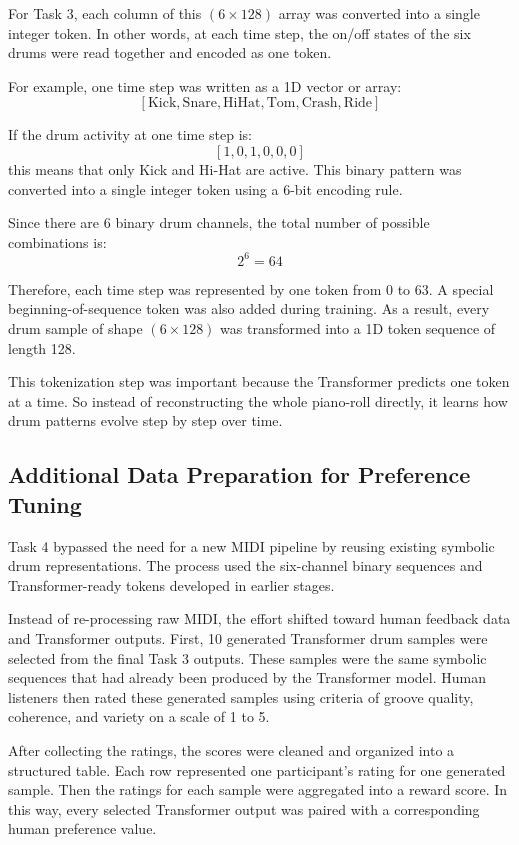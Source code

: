 \documentclass[conference]{IEEEtran}
\begin{document}
For Task 3, each column of this $(6 \times 128)$ array was converted into a single integer token. In other words, at each time step, the on/off states of the six drums were read together and encoded as one token.

For example, one time step was written as a 1D vector or array:
\[
[\text{Kick}, \text{Snare}, \text{HiHat}, \text{Tom}, \text{Crash}, \text{Ride}]
\]

If the drum activity at one time step is:
\[
[1,0,1,0,0,0]
\]
this means that only Kick and Hi-Hat are active. This binary pattern was converted into a single integer token using a 6-bit encoding rule.

Since there are 6 binary drum channels, the total number of possible combinations is:
\[
2^6 = 64
\]

Therefore, each time step was represented by one token from 0 to 63. A special beginning-of-sequence token was also added during training. As a result, every drum sample of shape $(6 \times 128)$ was transformed into a 1D token sequence of length 128.

This tokenization step was important because the Transformer predicts one token at a time. So instead of reconstructing the whole piano-roll directly, it learns how drum patterns evolve step by step over time.

\subsection{Additional Data Preparation for Preference Tuning}
Task 4 bypassed the need for a new MIDI pipeline by reusing existing symbolic drum representations. The process used the six-channel binary sequences and Transformer-ready tokens developed in earlier stages.

Instead of re-processing raw MIDI, the effort shifted toward human feedback data and Transformer outputs. First, 10 generated Transformer drum samples were selected from the final Task 3 outputs. These samples were the same symbolic sequences that had already been produced by the Transformer model. Human listeners then rated these generated samples using criteria of groove quality, coherence, and variety on a scale of 1 to 5.

After collecting the ratings, the scores were cleaned and organized into a structured table. Each row represented one participant's rating for one generated sample. Then the ratings for each sample were aggregated into a reward score. In this way, every selected Transformer output was paired with a corresponding human preference value.
\end{document}
